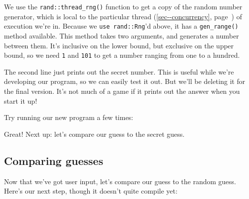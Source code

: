 \documentclass[a4paper,]{book}
\renewcommand*{\hyperref}[2][\ar]{%
  \def\ar{#2}%
  #2 (\autoref{#1}, page~\pageref{#1})}
\newenvironment{Shaded}{\begin{snugshade}}{\end{snugshade}}
\newcommand{\KeywordTok}[1]{\textcolor[rgb]{0.13,0.29,0.53}{\textbf{{#1}}}}
\newcommand{\NormalTok}[1]{{#1}}
\begin{document}
We use the \texttt{rand::thread\_rng()} function to get a copy of the
random number generator, which is local to the particular
\hyperref[sec--concurrency]{thread} of execution we're in. Because we
\texttt{use\ rand::Rng}'d above, it has a \texttt{gen\_range()} method
available. This method takes two arguments, and generates a number
between them. It's inclusive on the lower bound, but exclusive on the
upper bound, so we need \texttt{1} and \texttt{101} to get a number
ranging from one to a hundred.

The second line just prints out the secret number. This is useful while
we're developing our program, so we can easily test it out. But we'll be
deleting it for the final version. It's not much of a game if it prints
out the answer when you start it up!

Try running our new program a few times:

\begin{Shaded}
\end{Shaded}

Great! Next up: let's compare our guess to the secret guess.

\subsection{Comparing guesses}\label{comparing-guesses}

Now that we've got user input, let's compare our guess to the random
guess. Here's our next step, though it doesn't quite compile yet:
\end{document}
